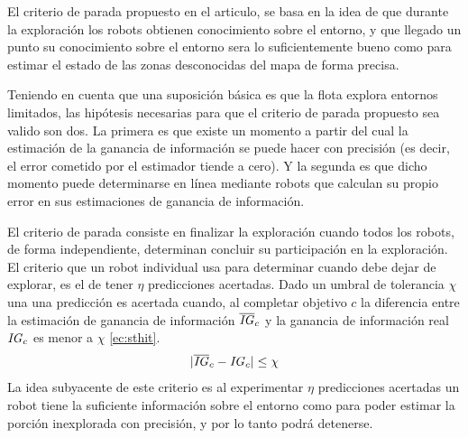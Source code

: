 El criterio de parada propuesto en el articulo, se basa en la idea de que durante la exploración los robots obtienen conocimiento sobre el entorno, y que llegado un punto su conocimiento sobre el entorno sera lo suficientemente bueno como para estimar el estado de las zonas desconocidas del mapa de forma precisa.

Teniendo en cuenta que una suposición básica es que la flota explora entornos limitados, las hipótesis necesarias para que el criterio de parada propuesto sea valido son dos. La primera es que existe un momento a partir del cual la estimación de la ganancia de información se puede hacer con precisión (es decir, el error cometido por el estimador tiende a cero). Y la segunda es que dicho momento puede determinarse en línea mediante robots que calculan su propio error en sus estimaciones de ganancia de información. 

El criterio de parada consiste en finalizar la exploración cuando todos los robots, de forma independiente, determinan concluir su participación en la exploración. El criterio que un robot individual usa para determinar cuando debe dejar de explorar, es el de tener $\eta$ predicciones acertadas. Dado un umbral de tolerancia $\chi$ una una predicción es acertada cuando, al completar objetivo $c$ la diferencia entre la estimación de ganancia de información $\overline{\mathit{IG}}_c$ y la ganancia de información real $\mathit{IG}_c$ es menor a $\chi$ \eqref{ec:sthit}. 
\begin{equation}\label{ec:sthit}
  |\overline{\mathit{IG}}_c - \mathit{IG}_c| \leq \chi
\end{equation}
La idea subyacente de este criterio es al experimentar $\eta$ predicciones acertadas un robot tiene la suficiente información sobre el entorno como para poder estimar la porción inexplorada con precisión, y por lo tanto podrá detenerse.

